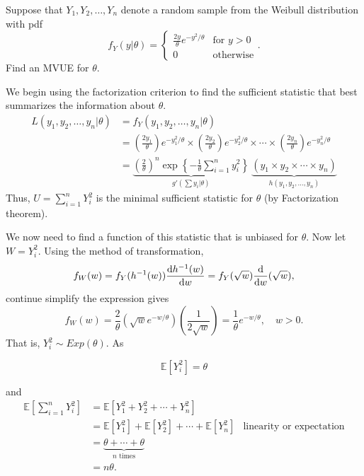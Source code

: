 \begin{example}
    Suppose that $Y_1, Y_2, \ldots, Y_n$ denote a random sample from the Weibull distribution with pdf 
    \[
        f_Y(y|\theta) = \begin{cases}
            \displaystyle \frac{2y}{\theta} e^{-y^2 / \theta} & \text{for } y > 0\\
            0 & \text{otherwise}
        \end{cases}.
    \]
    Find an MVUE for $\theta$.
\end{example}
\begin{solution}
    We begin using the factorization criterion to find the sufficient statistic that best summarizes 
    the information about $\theta$.
    \begin{align*}
        L(y_1, y_2, \ldots, y_n | \theta) &= f_Y(y_1, y_2, \ldots, y_n | \theta)\\
        &= \left( \frac{2y_1}{\theta} \right) e^{-y^2_1 / \theta} \times \left( \frac{2y_2}{\theta} \right) e^{-y^2_2 / \theta} \times \cdots \times \left( \frac{2y_n}{\theta} \right) e^{-y^2_n / \theta}\\
        &= \underbrace{\left( \frac{2}{\theta} \right)^n \exp \left\{ -\frac{1}{\theta} \sum_{i=1}^{n} y^2_i \right\} }_{g'(\sum y_i | \theta)} \> \underbrace{(y_1 \times y_2 \times \cdots \times y_n)}_{h(y_1, y_2, \ldots, y_n)}
    \end{align*}
    Thus, $U = \sum_{i=1}^{n} Y^2_i$ is the minimal sufficient statistic for $\theta$ (by Factorization theorem). 

    We now need to find a function of this statistic that is unbiased for $\theta$. Now let $W = Y^2_i$.
    Using the method of transformation,
    \begin{align*}
        f_W(w) = f_Y(h^{-1}(w)) \odv{h^{-1}(w)}{w} = f_Y(\sqrt{w}) \odv{}{w}(\sqrt{w}),
    \end{align*}
    continue simplify the expression gives 
    \[
        f_W(w) = \frac{2}{\theta} \left( \sqrt{w} e^{-w/\theta} \right) \left( \frac{1}{2\sqrt{w}} \right)
        = \frac{1}{\theta} e^{-w/\theta}, \quad w > 0.
    \]
    That is, $Y^2_i \sim Exp(\theta)$. As

    \begin{equation}
        \mathbb{E}[Y^2_i] = \theta
    \end{equation}

    and 
    \begin{align*}
        \mathbb{E}\left[\sum_{i=1}^{n} Y^2_i \right] &= \mathbb{E}[Y^2_1 + Y^2_2 + \cdots + Y^2_n]\\
        &= \mathbb{E}[Y^2_1] + \mathbb{E}[Y^2_2] + \cdots + \mathbb{E}[Y^2_n] & \text{linearity or expectation}\\
        &= \underbrace{\theta + \cdots + \theta}_{n \text{ times}}\\
        &= n \theta.
    \end{align*}
\end{solution}


